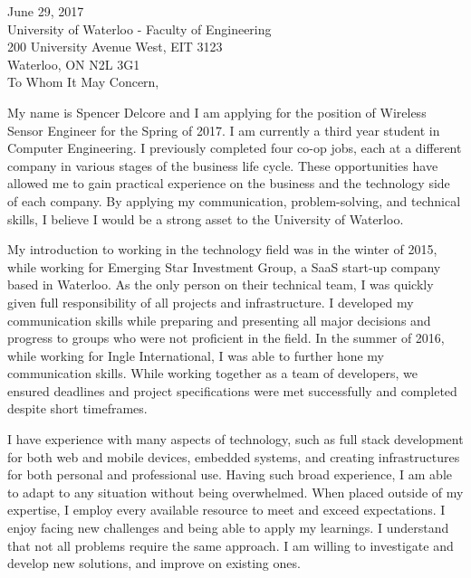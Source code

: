 \documentclass{resume}
\begin{document}
\begin{rSection}{}\end{rSection}

June 29, 2017\\
University of Waterloo - Faculty of Engineering\\
200 University Avenue West, EIT 3123\\
Waterloo, ON N2L 3G1\\

To Whom It May Concern,
\par
\hspace{36pt}
My name is Spencer Delcore and I am applying for the position of Wireless Sensor Engineer for the Spring of 2017. I am currently a third year student in Computer Engineering. I previously completed four co-op jobs, each at a different company in various stages of the business life cycle. These opportunities have allowed me to gain practical experience on the business and the technology side of each company. By applying my communication, problem-solving, and technical skills, I believe I would be a strong asset to the University of Waterloo.

\hspace{36pt}
My introduction to working in the technology field was in the winter of 2015, while working for Emerging Star Investment Group, a SaaS start-up company based in Waterloo. As the only person on their technical team, I was quickly given full responsibility of all projects and infrastructure. I developed my communication skills while preparing and presenting all major decisions and progress to groups who were not proficient in the field. In the summer of 2016, while working for Ingle International, I was able to further hone my communication skills. While working together as a team of developers, we ensured deadlines and project specifications were met successfully and completed despite short timeframes.

\hspace{36pt}
I have experience with many aspects of technology, such as full stack development for both web and mobile devices, embedded systems, and creating infrastructures for both personal and professional use. Having such broad experience, I am able to adapt to any situation without being overwhelmed. When placed outside of my expertise, I employ every available resource to meet and exceed expectations. I enjoy facing new challenges and being able to apply my learnings. I understand that not all problems require the same approach. I am willing to investigate and develop new solutions, and improve on existing ones.
\end{document}
